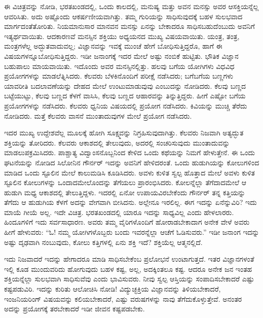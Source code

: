 ಈ ವಿಚಿತ್ರವನ್ನು ನೋಡಿ, ಭರತಖಂಡದಲ್ಲಿ, ಒಂದು ಕಾಲದಲ್ಲಿ, ಮನುಷ್ಯ ಮತ್ತು ಅವನ ಮನಸ್ಸು ಅವರ ಆಸಕ್ತಿಯನ್ನೆಲ್ಲ ಆವರಿಸಿತು. ಅದು ಅಷ್ಟೊಂದು ಆಕರ್ಷಣೀಯವಾಗಿತ್ತು. ತಮ್ಮ ಗುರಿಯನ್ನು ಸಾಧಿಸುವುದಕ್ಕೆ ಬಹಳ ಸುಲಭವಾದ ಮಾರ್ಗದಂತೆ\break ತೋರಿತು. ನಿಯಮಾನುಸಾರ ಮಾನವನ ಮನಸ್ಸು ಏನನ್ನು ಬೇಕಾದರೂ ಸಾಧಿಸಬಹುದೆಂಬುದು ಅವನಿಗೆ ಇತ್ಯರ್ಥವಾಯಿತು. ಆದಕಾರಣವೆ ಮನಸ್ಸಿನ ಶಕ್ತಿಯು ಅಧ್ಯಯನದ ಮುಖ್ಯ ವಿಷಯವಾಯಿತು. ಯಂತ್ರ, ತಂತ್ರ, ಮಂತ್ರಗಳೆಲ್ಲ ಅದ್ಭುತವಾದುವಲ್ಲ; ವಿಜ್ಞಾನವನ್ನು ಇವಕ್ಕೆ ಮುಂಚೆ ಹೇಗೆ ಬೋಧಿಸುತ್ತಿದ್ದರೊ, ಹಾಗೆ ಈ ವಿಷಯಗಳನ್ನೂ\break ಬೋಧಿಸುತ್ತಿದ್ದರು. ಇಡೀ ಜನಾಂಗಕ್ಕೆ ಇದರ ಮೇಲೆ ಅಷ್ಟು ನಂಬಿಕೆ ಹುಟ್ಟಿತು. ಭೌತಿಕ ವಿಜ್ಞಾನ ಬಹುಪಾಲು ಮಾಯವಾಯಿತು. ಇದೊಂದು ಅವರ ಮನಸ್ಸಿನಲ್ಲಿತ್ತು. ಹಲವು ಬಗೆಯ ಯೋಗಿಗಳು ವಿಧವಿಧ ಪ್ರಯೋಗಗಳನ್ನು ಮಾಡಲೆತ್ನಿಸಿದರು. ಕೆಲವರು ಬೆಳಕಿನೊಂದಿಗೆ ಪರೀಕ್ಷೆ ನಡೆಸಿದರು; ಬಗೆಬಗೆಯ ಬಣ್ಣಗಳು ಯಾವರೀತಿ ಬದಲಾವಣೆಯನ್ನು ದೇಹದ ಮೇಲೆ ಉಂಟುಮಾಡುವುವು ಎಂಬುದನ್ನು ನೋಡಿದರು. ಕೆಲವು ಬಣ್ಣದ ಬಟ್ಟೆಯುಟ್ಟು, ಕೆಲವು ಬಣ್ಣದ ಕೆಳಗೆ ವಾಸಿಸಿ, ಕೆಲವು ಬಣ್ಣದ ಆಹಾರವನ್ನು ತಿನ್ನುತ್ತಿದ್ದರು. ಹೀಗೆ ಎಷ್ಟೋ ಬಗೆಯ ಪ್ರಯೋಗಗಳನ್ನು ನಡೆಸಿದರು. ಕೆಲವರು ಧ್ವನಿಯ ವಿಷಯದಲ್ಲಿ ಪ್ರಯೋಗ ನಡೆಸಿದರು. ಕಿವಿಯನ್ನು ಮುಚ್ಚಿ ತೆರೆದು ನೋಡಿದರು. ಮತ್ತೆ ಕೆಲವರು ವಾಸನೆ ಮುಂತಾದುವುಗಳ ಮೇಲೆ ಪ್ರಯೋಗ ನಡೆಸಿದರು.

ಇದರ ಮುಖ್ಯ ಉದ್ದೇಶವೆಲ್ಲ ಮೂಲಕ್ಕೆ ಹೋಗಿ ಸೂಕ್ಷ್ಮವನ್ನು ನಿಗ್ರಹಿಸುವುದಾಗಿತ್ತು. ಕೆಲವರು ನಿಜವಾಗಿ ಅತ್ಯದ್ಭುತ ಶಕ್ತಿಯನ್ನು ತೋರಿದರು. ಕೆಲವರು ಆಕಾಶದಲ್ಲಿ ತೇಲುವುದು, ಅದರಲ್ಲಿ ಸಂಚರಿಸುವುದು ಮುಂತಾದುವನ್ನು ಮಾಡಲುಪಕ್ರಮಿಸಿದರು. ಪಾಶ್ಚಾತ್ಯ ವಿದ್ವಾಂಸನೊಬ್ಬನಿಂದ ಕೇಳಿದ ಒಂದು ಕಥೆಯನ್ನು ನಿಮಗೆ ಹೇಳುತ್ತೇನೆ. ಈ ಒಂದು ಘಟನೆಯನ್ನು ನೋಡಿದ ಸಿಲೋನಿನ ಗೌರ್ನರ್‌ ಇದನ್ನು ಅವನಿಗೆ ಹೇಳಿದರಂತೆ. ಒಂದು ಹುಡುಗಿಯನ್ನು ಕೋಲುಗಳಿಂದ ಮಾಡಿದ ಒಂದು ಸ್ಟೂಲಿನ ಮೇಲೆ ಕಾಲುಮಡಿಸಿ ಕೂಡಿಸಿದರು. ಅವಳು ಕುಳಿತ ಸ್ವಲ್ಪ ಹೊತ್ತಾದ ಮೇಲೆ ಅವಳು ಕುಳಿತ ಸ್ಟೂಲಿನ ಕೋಲುಗಳನ್ನು ಒಂದಾದಮೇಲೊಂದನ್ನು ತೆಗೆಯಲು ಪ್ರಾರಂಭಿಸಿದರು. ಕೋಲನ್ನೆಲ್ಲಾ ತೆಗೆದಾದಮೇಲೆ ಆ ಹುಡುಗಿ ಮಧ್ಯ ಆಕಾಶದಲ್ಲಿ ತೇಲುತ್ತಿದ್ದಳು. ಇದರಲ್ಲಿ ಏನೋ ಉಪಾಯವಿರಬೇಕೆಂದು ಗೌರ್ನರ್‌ ತನ್ನ ಕತ್ತಿಯನ್ನು ತೆಗೆದು ಆ ಹುಡುಗಿಯ ಕೆಳಗೆ ಅದನ್ನು ವೇಗವಾಗಿ ಬೀಸಿದನು. ಅಲ್ಲೇನೂ ಇರಲಿಲ್ಲ. ಈಗ ಇದನ್ನು ಏನೆನ್ನುವಿರಿ? ಇದು ಮಾಯೆ ಗೀಯೆ ಅಲ್ಲ. ಇದೇ ವಿಚಿತ್ರ. ಭರತಖಂಡದಲ್ಲಿ ಯಾರೂ ಇದನ್ನು ಸಾಧ್ಯವಿಲ್ಲ ಎಂದು ಹೇಳಲಾರರು. ಹಿಂದೂಗಳಿಗೆ ಇದು ಸರ್ವಸಾಧಾರಣ. ಅವರು ತಮ್ಮ ವೈರಿಗಳೊಂದಿಗೆ ಹೋರಾಡಬೇಕಾದಾಗ ಅನೇಕ ವೇಳೆ ಅವರು ಹೀಗೆ ಹೇಳುವರು: “ಓ! ನಮ್ಮ ಯೋಗಿಗಳೊಬ್ಬರು ಬಂದು ಇವರನ್ನೆಲ್ಲಾ ಆಚೆಗೆ ಓಡಿಸುವರು.” ಇಡೀ ಜನಾಂಗ ಇದನ್ನು ಅಷ್ಟು ದೃಢವಾಗಿ ನಂಬುವುದು, ಕೋಲು ಕತ್ತಿಗಳಲ್ಲಿ ಏನು ಶಕ್ತಿ ಇದೆ? ಶಕ್ತಿಯೆಲ್ಲ ಆತ್ಮನಲ್ಲಿದೆ.

ಇದು ನಿಜವಾದರೆ ಇದನ್ನು ಹೇಗಾದರೂ ಮಾಡಿ ಸಾಧಿಸಬೇಕೆಂಬ ಪ್ರಲೋಭನೆ ಉಂಟಾಗುತ್ತದೆ. ಇತರ ವಿಜ್ಞಾನಗಳಂತೆ ಇಲ್ಲಿ ಕೂಡ ಮುಂದುವರಿದು ಹೋಗುವುದು ಬಹಳ ಕಷ್ಟ, ಅಲ್ಲ, ಅದಕ್ಕಿಂತಲೂ ಕಷ್ಟ. ಆದರೂ ಅನೇಕ ಜನ ಇಂತಹ ಶಕ್ತಿಯನ್ನೆಲ್ಲಾ ಸುಲಭವಾಗಿ ಸಾಧಿಸುವೆವು ಎಂದು ಭಾವಿಸುವರು. ನೀವು ಸ್ವಲ್ಪ ಆಸ್ತಿಯನ್ನು ಸಂಪಾದಿಸಬೇಕಾದರೆ ಎಷ್ಟು ಕಷ್ಟಪಡುವಿರಿ. ಇದನ್ನು ಕುರಿತು ಆಲೋಚಿಸಿ ನೋಡಿ! ವಿದ್ಯುಚ್ಛಕ್ತಿಯ ವಿಜ್ಞಾನವನ್ನು ತಿಳಿಯಬೇಕಾದರೆ, ಇಂಜನಿಯರಿಂಗ್ ವಿಷಯವನ್ನು ಕಲಿಯಬೇಕಾದರೆ, ಎಷ್ಟು ವರುಷಗಳನ್ನು ನಾವು ತೆಗೆದುಕೊಳ್ಳುತ್ತೇವೆ. ಅನಂತರ ಅದನ್ನು ಪ್ರಯೋಗಕ್ಕೆ ತರಬೇಕಾದರೆ ಇಡೀ ಜೀವನ ಕಷ್ಟಪಡಬೇಕು.

